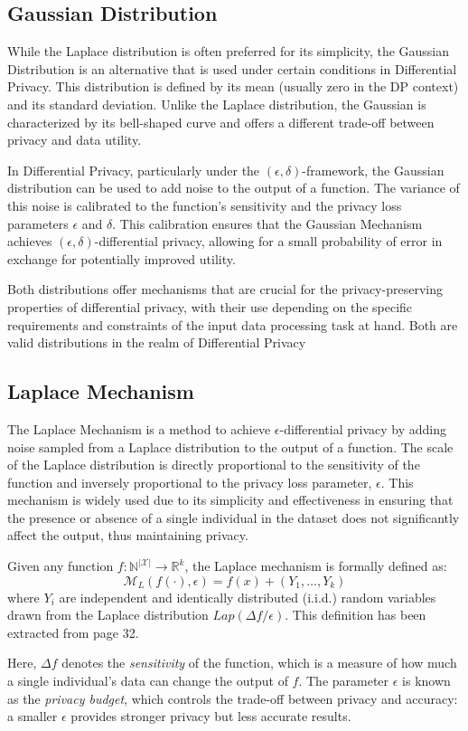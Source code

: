 \subsection{Gaussian Distribution}

While the Laplace distribution is often preferred for its simplicity, the Gaussian Distribution is an alternative that is used under certain conditions in Differential Privacy. This distribution is defined by its mean (usually zero in the DP context) and its standard deviation. Unlike the Laplace distribution, the Gaussian is characterized by its bell-shaped curve and offers a different trade-off between privacy and data utility.

In Differential Privacy, particularly under the $(\epsilon, \delta)$-framework, the Gaussian distribution can be used to add noise to the output of a function. The variance of this noise is calibrated to the function's sensitivity and the privacy loss parameters $\epsilon$ and $\delta$. This calibration ensures that the Gaussian Mechanism achieves $(\epsilon, \delta)$-differential privacy, allowing for a small probability of error in exchange for potentially improved utility\citep[p. 31]{Dwork2013}.

Both distributions offer mechanisms that are crucial for the privacy-preserving properties of differential privacy, with their use depending on the specific requirements and constraints of the input data processing task at hand. Both are valid distributions in the realm of Differential Privacy

\subsection{Laplace Mechanism}
The Laplace Mechanism is a method to achieve $\epsilon$-differential privacy by adding noise sampled from a Laplace distribution to the output of a function. The scale of the Laplace distribution is directly proportional to the sensitivity of the function and inversely proportional to the privacy loss parameter, $\epsilon$. This mechanism is widely used due to its simplicity and effectiveness in ensuring that the presence or absence of a single individual in the dataset does not significantly affect the output, thus maintaining privacy.
\begin{definition}
Given any function $f: \mathbb{N}^{|\mathcal{X}|} \rightarrow \mathbb{R}^k$, the Laplace mechanism is formally defined as:
\begin{equation}
\mathcal{M}_L(f(\cdot), \epsilon) = f(x) + (Y_1, \ldots, Y_k)
\end{equation}
where $Y_i$ are independent and identically distributed (i.i.d.) random variables drawn from the Laplace distribution $Lap(\Delta f/\epsilon)$. This definition has been extracted from \citeauthor{Dwork2013} page 32.
\end{definition}
Here, $\Delta f$ denotes the \textit{sensitivity} of the function, which is a measure of how much a single individual's data can change the output of $f$. The parameter $\epsilon$ is known as the \textit{privacy budget}, which controls the trade-off between privacy and accuracy: a smaller $\epsilon$ provides stronger privacy but less accurate results.

